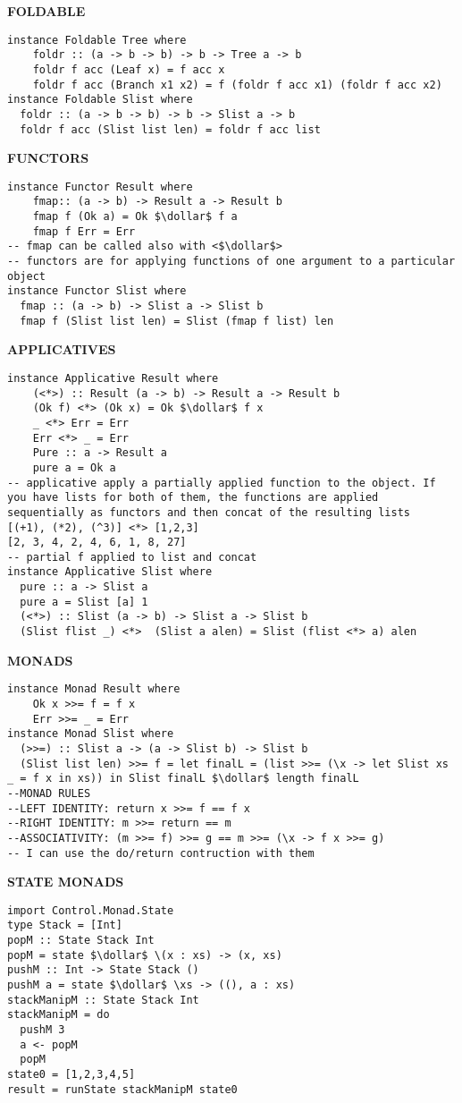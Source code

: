\documentclass{article}
\newcommand{\dollar}{\mbox{\textdollar}}
\begin{document}
\begin{multicols*}{4}
\hrulefill

\textbf{FOLDABLE}
\begin{lstlisting}
instance Foldable Tree where
    foldr :: (a -> b -> b) -> b -> Tree a -> b
    foldr f acc (Leaf x) = f acc x
    foldr f acc (Branch x1 x2) = f (foldr f acc x1) (foldr f acc x2)
instance Foldable Slist where
  foldr :: (a -> b -> b) -> b -> Slist a -> b
  foldr f acc (Slist list len) = foldr f acc list
\end{lstlisting}

\hrulefill

\textbf{FUNCTORS}
\begin{lstlisting}
instance Functor Result where
    fmap:: (a -> b) -> Result a -> Result b
    fmap f (Ok a) = Ok $\dollar$ f a
    fmap f Err = Err
-- fmap can be called also with <$\dollar$>
-- functors are for applying functions of one argument to a particular object
instance Functor Slist where
  fmap :: (a -> b) -> Slist a -> Slist b
  fmap f (Slist list len) = Slist (fmap f list) len
\end{lstlisting}

\hrulefill

\textbf{APPLICATIVES}
\begin{lstlisting}
instance Applicative Result where
    (<*>) :: Result (a -> b) -> Result a -> Result b
    (Ok f) <*> (Ok x) = Ok $\dollar$ f x
    _ <*> Err = Err
    Err <*> _ = Err
    Pure :: a -> Result a
    pure a = Ok a
-- applicative apply a partially applied function to the object. If you have lists for both of them, the functions are applied sequentially as functors and then concat of the resulting lists
[(+1), (*2), (^3)] <*> [1,2,3]
[2, 3, 4, 2, 4, 6, 1, 8, 27]
-- partial f applied to list and concat
instance Applicative Slist where
  pure :: a -> Slist a
  pure a = Slist [a] 1
  (<*>) :: Slist (a -> b) -> Slist a -> Slist b
  (Slist flist _) <*>  (Slist a alen) = Slist (flist <*> a) alen
\end{lstlisting}

\hrulefill

\textbf{MONADS}
\begin{lstlisting}
instance Monad Result where
    Ok x >>= f = f x
    Err >>= _ = Err
instance Monad Slist where
  (>>=) :: Slist a -> (a -> Slist b) -> Slist b
  (Slist list len) >>= f = let finalL = (list >>= (\x -> let Slist xs _ = f x in xs)) in Slist finalL $\dollar$ length finalL
--MONAD RULES
--LEFT IDENTITY: return x >>= f == f x
--RIGHT IDENTITY: m >>= return == m
--ASSOCIATIVITY: (m >>= f) >>= g == m >>= (\x -> f x >>= g)
-- I can use the do/return contruction with them
\end{lstlisting}

\hrulefill

\textbf{STATE MONADS}
\begin{lstlisting}
import Control.Monad.State
type Stack = [Int]
popM :: State Stack Int
popM = state $\dollar$ \(x : xs) -> (x, xs)
pushM :: Int -> State Stack ()
pushM a = state $\dollar$ \xs -> ((), a : xs)
stackManipM :: State Stack Int
stackManipM = do
  pushM 3
  a <- popM
  popM
state0 = [1,2,3,4,5]
result = runState stackManipM state0
\end{lstlisting}

\end{multicols*}
\end{document}
